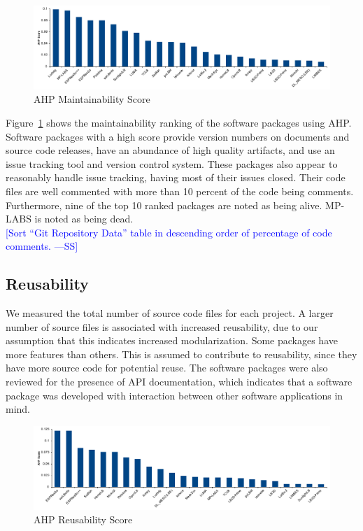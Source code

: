 \documentclass[final, 3p, times, authoryear]{elsarticle}
\newcommand{\authornote}[3]{\textcolor{#1}{[#3 ---#2]}}
\newcommand{\authornote}[3]{}
\newcommand{\wss}[1]{\authornote{blue}{SS}{#1}} %
\begin{document}
\begin{figure}[h!]
	\begin{center}
		\includegraphics[width=1.0\textwidth]{./figures/maintainability_chart.pdf}
		\caption{AHP Maintainability Score}
		\label{Fig_Maintainability}
	\end{center}
\end{figure}

Figure~\ref{Fig_Maintainability} shows the maintainability ranking of the
software packages using AHP. Software packages with a high score provide version
numbers on documents and source code releases, have an abundance of high quality
artifacts, and use an issue tracking tool and version control system. These
packages also appear to reasonably handle issue tracking, having most of their
issues closed. Their code files are well commented with more than 10 percent of
the code being comments. Furthermore, nine of the top 10 ranked packages are
noted as being alive. MP-LABS is noted as being dead.\\

\wss{Sort ``Git Repository Data'' table in descending order of percentage of
code comments.}

\subsection{Reusability} \label{reusabilityresults}

We measured the total number of source code files for each project. A larger
number of source files is associated with increased reusability, due to our
assumption that this indicates increased modularization. Some packages have more
features than others.  This is assumed to contribute to reusability, since they have
more source code for potential reuse. The software packages were also reviewed
for the presence of API documentation, which indicates that a software package
was developed with interaction between other software applications in mind. 

\begin{figure}[h!]
	\begin{center}
		\includegraphics[width=1.0\textwidth]{./figures/reusability_chart.pdf}
		\caption{AHP Reusability Score}
		\label{Fig_Reusabilty}
	\end{center}
\end{figure}
\end{document}
